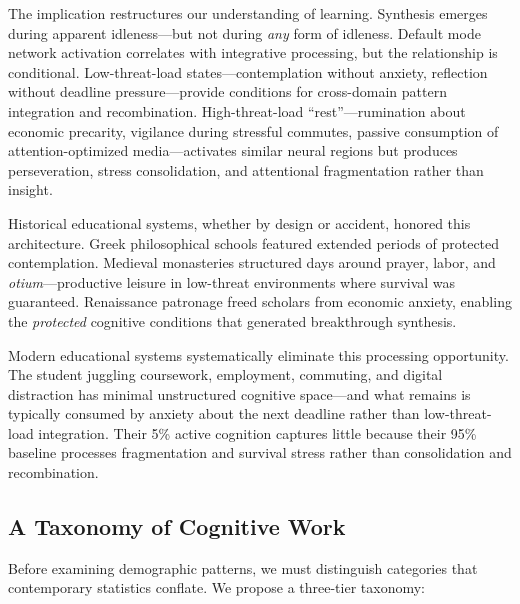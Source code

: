 The implication restructures our understanding of learning. Synthesis emerges during apparent idleness---but not during \textit{any} form of idleness. Default mode network activation correlates with integrative processing, but the relationship is conditional. Low-threat-load states---contemplation without anxiety, reflection without deadline pressure---provide conditions for cross-domain pattern integration and recombination. High-threat-load ``rest''---rumination about economic precarity, vigilance during stressful commutes, passive consumption of attention-optimized media---activates similar neural regions but produces perseveration, stress consolidation, and attentional fragmentation rather than insight.

Historical educational systems, whether by design or accident, honored this architecture. Greek philosophical schools featured extended periods of protected contemplation. Medieval monasteries structured days around prayer, labor, and \textit{otium}---productive leisure in low-threat environments where survival was guaranteed. Renaissance patronage freed scholars from economic anxiety, enabling the \textit{protected} cognitive conditions that generated breakthrough synthesis.

Modern educational systems systematically eliminate this processing opportunity. The student juggling coursework, employment, commuting, and digital distraction has minimal unstructured cognitive space---and what remains is typically consumed by anxiety about the next deadline rather than low-threat-load integration. Their 5\% active cognition captures little because their 95\% baseline processes fragmentation and survival stress rather than consolidation and recombination.

\subsection{A Taxonomy of Cognitive Work}

Before examining demographic patterns, we must distinguish categories that contemporary statistics conflate. We propose a three-tier taxonomy:

